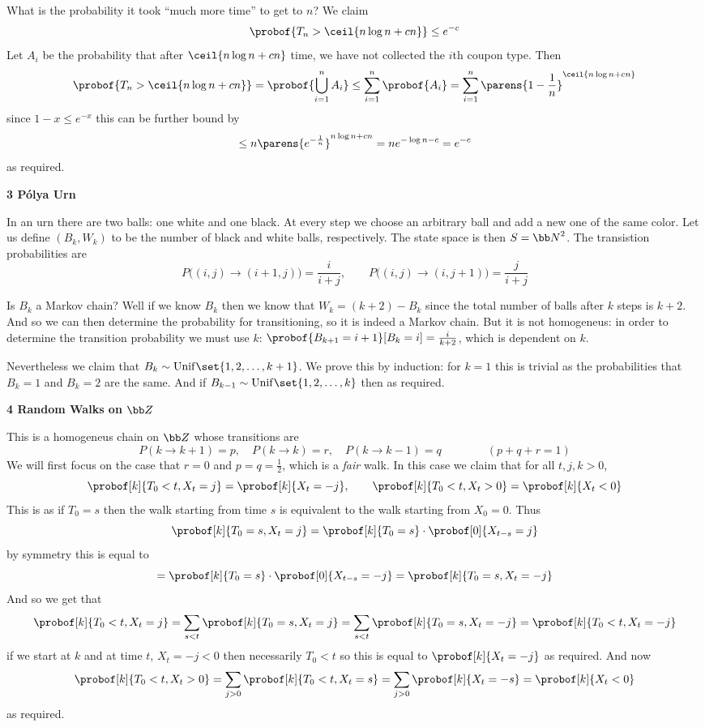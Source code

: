 What is the probability it took ``much more time'' to get to $n$?
We claim
$$ \probof{T_n>\ceil{n\log n+cn}}\leq e^{-c} $$
Let $A_i$ be the probability that after $\ceil{n\log n+cn}$ time, we have not collected the $i$th coupon type.
Then
$$ \probof{T_n>\ceil{n\log n+cn}} = \probof{\bigcup_{i=1}^n A_i} \leq \sum_{i=1}^n\probof{A_i} = \sum_{i=1}^n\parens{1-\frac1n}^{\ceil{n\log n+cn}} $$
since $1-x\leq e^{-x}$ this can be further bound by
$$ \leq n\parens{e^{-\frac1n}}^{n\log n+cn} = ne^{-\log n-c} = e^{-c} $$
as required.

\smallskip
{\bf 3 P\'olya Urn}

In an urn there are two balls: one white and one black.
At every step we choose an arbitrary ball and add a new one of the same color.
Let us define $(B_k,W_k)$ to be the number of black and white balls, respectively.
The state space is then $S={\bb N}^2$.
The transistion probabilities are
$$ P\bigl((i,j)\to(i+1,j)\bigr) = \frac i{i+j},\qquad P\bigl((i,j)\to(i,j+1)\bigr) = \frac j{i+j} $$

Is $B_k$ a Markov chain?
Well if we know $B_k$ then we know that $W_k=(k+2)-B_k$ since the total number of balls after $k$ steps is $k+2$.
And so we can then determine the probability for transitioning, so it is indeed a Markov chain.
But it is not homogeneus: in order to determine the transition probability we must use $k$: $\probof{B_{k+1}=i+1}[B_k=i]=\frac i{k+2}$, which is dependent on $k$.

Nevertheless we claim that $B_k\sim{\rm Unif}\set{1,2,\dots,k+1}$.
We prove this by induction: for $k=1$ this is trivial as the probabilities that $B_k=1$ and $B_k=2$ are the same.
And if $B_{k-1}\sim{\rm Unif}\set{1,2,\dots,k}$ then
as required.

\smallskip
{\bf 4 Random Walks on ${\bb Z}$}

This is a homogeneus chain on ${\bb Z}$ whose transitions are
$$ P(k\to k+1)=p,\quad P(k\to k)=r,\quad P(k\to k-1)=q\qquad\qquad (p+q+r=1) $$
We will first focus on the case that $r=0$ and $p=q=\frac12$, which is a {\it fair} walk.
In this case we claim that for all $t,j,k>0$,
$$ \probof[k]{T_0<t,X_t=j} = \probof[k]{X_t=-j},\qquad \probof[k]{T_0<t,X_t>0} = \probof[k]{X_t<0} $$
This is as if $T_0=s$ then the walk starting from time $s$ is equivalent to the walk starting from $X_0=0$.
Thus
$$ \probof[k]{T_0=s,X_t=j} = \probof[k]{T_0=s}\cdot\probof[0]{X_{t-s}=j} $$
by symmetry this is equal to
$$ = \probof[k]{T_0=s}\cdot\probof[0]{X_{t-s}=-j} = \probof[k]{T_0=s,X_t=-j} $$
And so we get that
$$ \probof[k]{T_0<t,X_t=j} = \sum_{s<t}\probof[k]{T_0=s,X_t=j} = \sum_{s<t}\probof[k]{T_0=s,X_t=-j} = \probof[k]{T_0<t,X_t=-j} $$
if we start at $k$ and at time $t$, $X_t=-j<0$ then necessarily $T_0<t$ so this is equal to $\probof[k]{X_t=-j}$ as required.
And now
$$ \probof[k]{T_0<t,X_t>0} = \sum_{j>0}\probof[k]{T_0<t,X_t=s} = \sum_{j>0}\probof[k]{X_t=-s} = \probof[k]{X_t<0} $$
as required.

